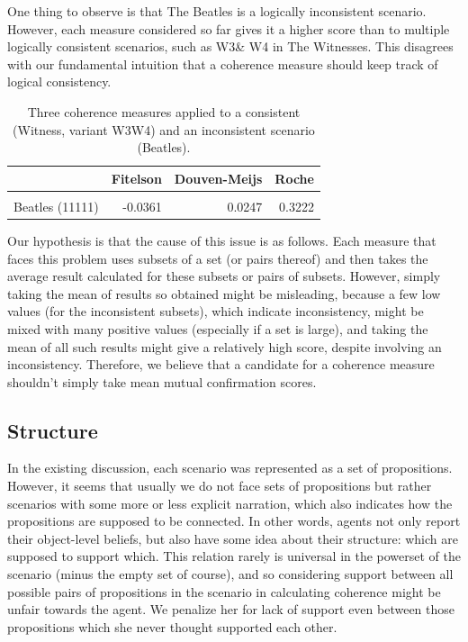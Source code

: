 \documentclass[10pt,]{scrartcl}
\begin{document}
One thing to observe is that \textsf{The Beatles} is a logically inconsistent scenario. However, each  measure considered so far gives it a higher score than to multiple  logically consistent scenarios, such as \textsf{W3}\& \textsf{W4} in  \textsf{The Witnesses}. This  disagrees with our fundamental
intuition that a coherence measure should keep track of logical
consistency. 



\begin{table}
\centering
\begin{tabular}{lrrr}
\toprule
  & Fitelson & Douven-Meijs & Roche\\
\midrule
\cellcolor{gray!6}{Witness W3W4 (11)} & \cellcolor{gray!6}{-0.2336} & \cellcolor{gray!6}{-0.1103} & \cellcolor{gray!6}{0.3147}\\
Beatles (11111) & -0.0361 & 0.0247 & 0.3222\\
\bottomrule
\end{tabular}
\caption{Three coherence measures applied to a consistent  (Witness, variant W3W4) and an inconsistent scenario (Beatles).}
\end{table}

Our hypothesis is that the cause of this issue is as follows. Each measure that faces this problem  uses subsets of a set (or pairs thereof) and then takes the average
result calculated for these subsets or pairs of subsets. However, simply
taking the mean of results so obtained might be misleading, because a
few low values (for the inconsistent subsets), which indicate
inconsistency, might be mixed with many positive values (especially if a
set is large), and taking the mean of all such results might give a
relatively high score, despite involving an inconsistency. Therefore, we
believe that a candidate for a coherence measure shouldn't simply take
mean mutual confirmation scores.

\subsection{Structure}

In the existing discussion, each scenario was represented as a set of
propositions. However, it seems that usually we do not face sets of
propositions but rather scenarios with some more or less explicit
narration, which also indicates how the propositions are supposed to be
connected. In other words, agents not only report their object-level
beliefs, but also have some idea about their structure: which are
supposed to support which. This relation rarely is universal in the
powerset of the scenario (minus the empty set of course), and so
considering support between all possible pairs of propositions in the
scenario in calculating coherence might be unfair towards the agent. We
penalize her for lack of support even between those propositions which
she never thought supported each other.
\end{document}
